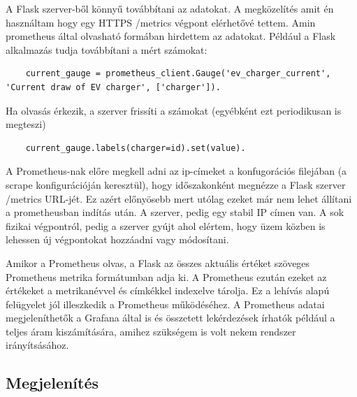 A Flask szerver-ből könnyű továbbítani az adatokat. A megközelítés amit én használtam hogy egy HTTPS /metrics 
végpont elérhetővé tettem. Amin prometheus által olvasható formában hirdettem az adatokat. 
Például a Flask alkalmazás tudja továbbítani a mért számokat:
\begin{lstlisting}
    current_gauge = prometheus_client.Gauge('ev_charger_current', 'Current draw of EV charger', ['charger']). 
\end{lstlisting}

Ha olvasás érkezik, a szerver frissíti a számokat (egyébként ezt periodikusan is megteszi)
\begin{lstlisting}
    current_gauge.labels(charger=id).set(value). 
\end{lstlisting}

A Prometheus-nak előre megkell adni az ip-címeket a konfugorációs filejában
(a scrape konfigurációján keresztül), hogy időszakonként megnézze a Flask szerver 
/metrics URL-jét. 
Ez azért előnyösebb mert utólag ezeket már nem lehet állítani a prometheusban indítás után.
A szerver, pedig egy stabil IP címen van. A sok fizikai végpontról, pedig a szerver gyújt ahol elértem, hogy 
üzem közben is lehessen új végpontokat hozzáadni vagy módosítani.

Amikor a Prometheus olvas, a Flask az összes aktuális értéket szöveges 
Prometheus metrika formátumban adja ki. A Prometheus ezután ezeket az értékeket a metrikanévvel és címkékkel 
indexelve tárolja. Ez a lehívás alapú felügyelet jól illeszkedik a Prometheus működéséhez. 
A Prometheus adatai megjeleníthetők a Grafana által is és összetett lekérdezések írhatók 
például a teljes áram kiszámítására, amihez szükségem is volt nekem rendszer irányítsásához.


\subsection{Megjelenítés}